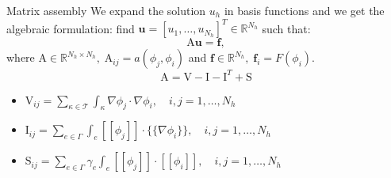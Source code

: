 \documentclass{beamer}
\begin{document}
\begin{frame}{Matrix assembly}
	We expand the solution $u_h$ in basis functions and we get the
	algebraic formulation: find $\mathbf{u} = [u_1, \dots, u_{N_h}]^T \in
	\mathbb{R}^{N_h} $ such that:
	\begin{equation*}
	\mathrm{A}\mathbf{u} = \mathbf{f},
	\end{equation*}
	where $\mathrm{A} \in \mathbb{R}^{N_h \times N_h}, \; \mathrm{A}_{ij} =
	a(\phi_j, \phi_i)$ and $\mathbf{f} \in \mathbb{R}^{N_h}, \; \mathbf{f}_i =
	F(\phi_i)$.\\
	\begin{equation*}
	\mathrm{A} =
	\mathrm{V} - \mathrm{I} - \mathrm{I}^T + \mathrm{S}
	\end{equation*}
	\begin{itemize}
		\item $\mathrm{V}_{ij} = \sum\limits_{\kappa \in \mathcal{T}}
		\int_\kappa
		\nabla \phi_j \cdot \nabla \phi_i, \quad i,j=1,\dots,N_h$
		\item $\mathrm{I}_{ij} = \sum\limits_{e \in \Gamma} \int_e
		[\![\phi_j]\!]
		\cdot \{\!\!\{ \nabla \phi_i \}\!\!\}, \quad i,j=1,\dots,N_h$
		\item $\mathrm{S}_{ij} = \sum\limits_{e \in \Gamma} \gamma_e \int_e
		[\![
		\phi_j ]\!] \cdot [\![ \phi_i ]\!], \quad i,j=1,\dots,N_h$
	\end{itemize}
\end{frame}
\end{document}
